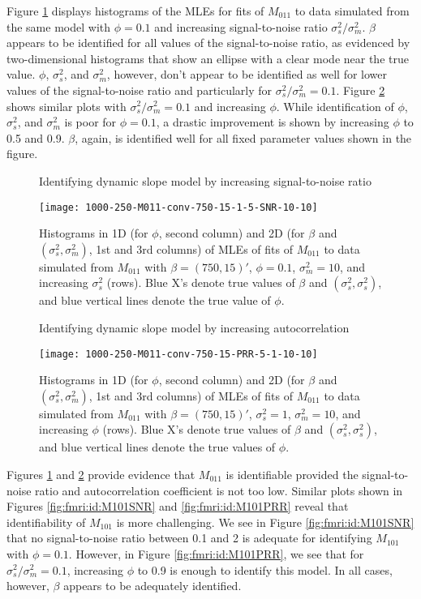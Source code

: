 Figure \ref{fig:fmri:id:M011SNR} displays histograms of the MLEs for fits of $M_{011}$ to data simulated from the same model with $\phi = 0.1$ and increasing signal-to-noise ratio $\sigma^2_s / \sigma^2_m$. $\beta$ appears to be identified for all values of the signal-to-noise ratio, as evidenced by two-dimensional histograms that show an ellipse with a clear mode near the true value. $\phi$, $\sigma^2_s$, and $\sigma^2_m$, however, don't appear to be identified as well for lower values of the signal-to-noise ratio and particularly for $\sigma^2_s / \sigma^2_m = 0.1$. Figure \ref{fig:fmri:id:M011PRR} shows similar plots with $\sigma^2_s / \sigma^2_m = 0.1$ and increasing $\phi$. While identification of $\phi$, $\sigma^2_s$, and $\sigma^2_m$ is poor for $\phi = 0.1$, a drastic improvement is shown by increasing $\phi$ to 0.5 and 0.9. $\beta$, again, is identified well for all fixed parameter values shown in the figure.

\begin{figure}
\ssp
\centering
\caption{Identifying dynamic slope model by increasing signal-to-noise ratio} \label{fig:fmri:id:M011SNR}
\texttt{[image: 1000-250-M011-conv-750-15-1-5-SNR-10-10]}
\caption*{Histograms in 1D (for $\phi$, second column) and 2D (for $\beta$ and $(\sigma^2_s,\sigma^2_m)$, 1st and 3rd columns) of MLEs of fits of $M_{011}$ to data simulated from $M_{011}$ with $\beta = (750,15)'$, $\phi = 0.1$, $\sigma^2_m = 10$, and increasing $\sigma^2_s$ (rows). Blue X's denote true values of $\beta$ and $(\sigma^2_s,\sigma^2_s)$, and blue vertical lines denote the true value of $\phi$.}
\end{figure}

\begin{figure}
\ssp
\centering
\caption{Identifying dynamic slope model by increasing autocorrelation} \label{fig:fmri:id:M011PRR}
\texttt{[image: 1000-250-M011-conv-750-15-PRR-5-1-10-10]}
\caption*{Histograms in 1D (for $\phi$, second column) and 2D (for $\beta$ and $(\sigma^2_s,\sigma^2_m)$, 1st and 3rd columns) of MLEs of fits of $M_{011}$ to data simulated from $M_{011}$ with $\beta = (750,15)'$, $\sigma^2_s = 1$, $\sigma^2_m = 10$, and increasing $\phi$ (rows). Blue X's denote true values of $\beta$ and $(\sigma^2_s,\sigma^2_s)$, and blue vertical lines denote the true values of $\phi$.}
\end{figure}

Figures \ref{fig:fmri:id:M011SNR} and \ref{fig:fmri:id:M011PRR} provide evidence that $M_{011}$ is identifiable provided the signal-to-noise ratio and autocorrelation coefficient is not too low. Similar plots shown in Figures \ref{fig:fmri:id:M101SNR} and \ref{fig:fmri:id:M101PRR} reveal that identifiability of $M_{101}$ is more challenging. We see in Figure \ref{fig:fmri:id:M101SNR} that no signal-to-noise ratio between 0.1 and 2 is adequate for identifying $M_{101}$ with $\phi = 0.1$. However, in Figure \ref{fig:fmri:id:M101PRR}, we see that for $\sigma^2_s / \sigma^2_m = 0.1$, increasing $\phi$ to 0.9 is enough to identify this model. In all cases, however, $\beta$ appears to be adequately identified.

